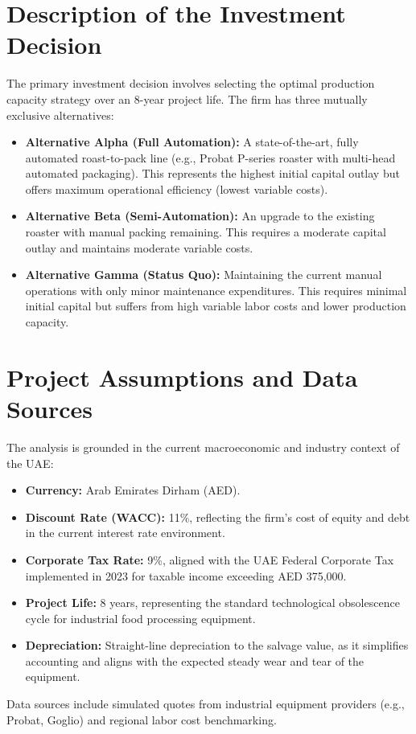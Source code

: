 \documentclass[12pt]{article}
\begin{document}
\section{Description of the Investment Decision}
The primary investment decision involves selecting the optimal production capacity strategy over an 8-year project life. The firm has three mutually exclusive alternatives:
\begin{itemize}
    \item \textbf{Alternative Alpha (Full Automation):} A state-of-the-art, fully automated roast-to-pack line (e.g., Probat P-series roaster with multi-head automated packaging). This represents the highest initial capital outlay but offers maximum operational efficiency (lowest variable costs).
    \item \textbf{Alternative Beta (Semi-Automation):} An upgrade to the existing roaster with manual packing remaining. This requires a moderate capital outlay and maintains moderate variable costs.
    \item \textbf{Alternative Gamma (Status Quo):} Maintaining the current manual operations with only minor maintenance expenditures. This requires minimal initial capital but suffers from high variable labor costs and lower production capacity.
\end{itemize}

\section{Project Assumptions and Data Sources}
The analysis is grounded in the current macroeconomic and industry context of the UAE:
\begin{itemize}
    \item \textbf{Currency:} Arab Emirates Dirham (AED).
    \item \textbf{Discount Rate (WACC):} 11\%, reflecting the firm's cost of equity and debt in the current interest rate environment.
    \item \textbf{Corporate Tax Rate:} 9\%, aligned with the UAE Federal Corporate Tax implemented in 2023 for taxable income exceeding AED 375,000.
    \item \textbf{Project Life:} 8 years, representing the standard technological obsolescence cycle for industrial food processing equipment.
    \item \textbf{Depreciation:} Straight-line depreciation to the salvage value, as it simplifies accounting and aligns with the expected steady wear and tear of the equipment.
\end{itemize}
Data sources include simulated quotes from industrial equipment providers (e.g., Probat, Goglio) and regional labor cost benchmarking. 
\end{document}
